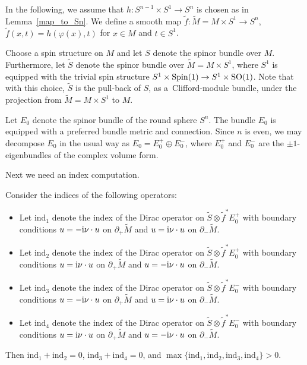 In the following, we assume that $h\colon S^{n-1} \times S^1 \to S^n$ is chosen as in Lemma~\ref{map_to_Sn}. We define a smooth map $\tilde{f}\colon \tilde{M} = M \times S^1\to S^n$, $
\tilde{f}(x,t) = h(\varphi(x),t)$ for $x \in M$ and $t \in S^1$.

Choose a spin structure on $M$ and let $S$ denote the spinor bundle over $M$. Furthermore, let $\tilde{S}$ denote the spinor bundle over $\tilde{M} = M \times S^1$, where $S^1$ is equipped with the trivial spin structure $S^1 \times {\rm Spin}(1) \to S^1 \times {\rm SO}(1)$.
Note that with this choice, $\tilde{S}$ is the pull-back of $S$, as a~Clifford-module bundle, under the projection from $\tilde{M} = M \times S^1$ to $M$.

Let $E_0$ denote the spinor bundle of the round sphere $S^n$.
The bundle $E_0$ is equipped with a preferred bundle metric and connection.
Since $n$ is even, we may decompose $E_0$ in the usual way as $E_0 = E_0^+ \oplus E_0^-$, where $E_0^+$ and $E_0^-$ are the $\pm 1$-eigenbundles of the complex volume form.

Next we need an index computation.

\begin{Proposition}
\label{index_even_dim}
Consider the indices of the following operators:
\begin{itemize}\itemsep=0pt
\item Let $\mathrm{ind}_1$ denote the index of the Dirac operator on $\tilde{S} \otimes \tilde{f}^* E_0^+$ with boundary conditions $u = -{\rm i} \nu \cdot u$ on $\partial_+ \tilde{M}$ and $u = {\rm i} \nu \cdot u$ on $\partial_- \tilde{M}$.
\item Let $\mathrm{ind}_2$ denote the index of the Dirac operator on $\tilde{S} \otimes \tilde{f}^* E_0^+$ with boundary conditions $u = {\rm i} \nu \cdot u$ on $\partial_+ \tilde{M}$ and $u = -{\rm i} \nu \cdot u$ on $\partial_- \tilde{M}$.
\item Let $\mathrm{ind}_3$ denote the index of the Dirac operator on $\tilde{S} \otimes \tilde{f}^* E_0^-$ with boundary conditions $u = -{\rm i} \nu \cdot u$ on $\partial_+ \tilde{M}$ and $u = {\rm i} \nu \cdot u$ on $\partial_- \tilde{M}$.
\item Let $\mathrm{ind}_4$ denote the index of the Dirac operator on $\tilde{S} \otimes \tilde{f}^* E_0^-$ with boundary conditions $u = {\rm i} \nu \cdot u$ on $\partial_+ \tilde{M}$ and $u = -{\rm i} \nu \cdot u$ on $\partial_- \tilde{M}$.
\end{itemize}
Then $\mathrm{ind}_1+\mathrm{ind}_2 = 0$, $\mathrm{ind}_3+\mathrm{ind}_4 = 0$, and $\max \{\mathrm{ind}_1,\mathrm{ind}_2, \mathrm{ind}_3, \mathrm{ind}_4\} > 0$.
\end{Proposition}

